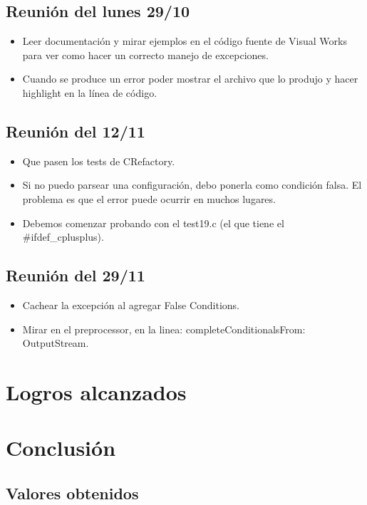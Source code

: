 \documentclass[a4paper,oneside,10pt]{article}
\begin{document}
\subsection{Reunión del lunes 29/10}
\begin{itemize}
 \item Leer documentación y mirar ejemplos en el código fuente de Visual Works para ver como hacer un correcto manejo de excepciones.
 \item Cuando se produce un error poder mostrar el archivo que lo produjo y hacer highlight en la línea de código.
\end{itemize}

\subsection{Reunión del 12/11}
\begin{itemize}
\item Que pasen los tests de CRefactory.
\item Si no puedo parsear una configuración, debo ponerla como condición falsa.  El problema es que el error puede ocurrir en muchos lugares.\item Debemos comenzar probando con el test19.c (el que tiene el \#ifdef\_cplusplus).
\end{itemize}

\subsection{Reunión del 29/11}
\begin{itemize}
\item Cachear la excepción al agregar False Conditions. 
\item Mirar en el preprocessor, en la linea: completeConditionalsFrom: OutputStream.
\end{itemize}

\section{Logros alcanzados}

\section{Conclusi\'on}

\subsection{Valores obtenidos}
\end{document}
